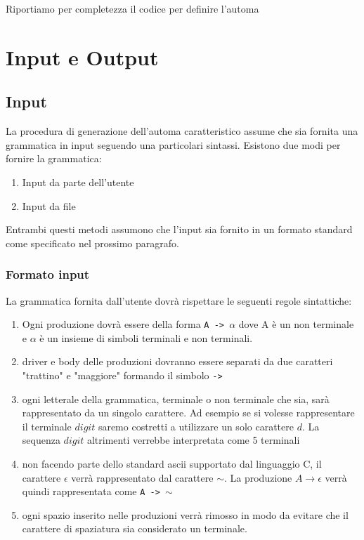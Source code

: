 \documentclass[12pt]{article}
\begin{document}
Riportiamo per completezza il codice per definire l'automa


\section{Input e Output}

\subsection{Input}
La procedura di generazione dell'automa caratteristico assume che sia fornita una grammatica in input seguendo una particolari sintassi. Esistono due modi per fornire la grammatica:
\begin{enumerate}
\item Input da parte dell'utente
\item Input da file
\end{enumerate}

Entrambi questi metodi assumono che l'input sia fornito in un formato standard come specificato nel prossimo paragrafo.

\subsubsection{Formato input}\label{sec:inputformat}
La grammatica fornita dall'utente dovrà rispettare le seguenti regole sintattiche:
\begin{enumerate}
\item Ogni produzione dovrà essere della forma \texttt{A -> $\alpha$} dove A è un non terminale e $\alpha$ è un insieme di simboli terminali e non terminali. 
\item driver e body delle produzioni dovranno essere separati da due caratteri "trattino" e "maggiore" formando il simbolo \texttt{->} 
\item ogni letterale della grammatica, terminale o non terminale che sia, sarà rappresentato da un singolo carattere. Ad esempio se si volesse rappresentare il terminale $digit$ saremo costretti a utilizzare un solo carattere $d$. La sequenza $digit$ altrimenti verrebbe interpretata come 5 terminali
\item non facendo parte dello standard ascii supportato dal linguaggio C, il carattere $\epsilon$ verrà rappresentato dal carattere $\sim$.
La produzione $A \to \epsilon$ verrà quindi rappresentata come \texttt{A -> $\sim$}
\item ogni spazio inserito nelle produzioni verrà rimosso in modo da evitare che il carattere di spaziatura sia considerato un terminale.

\end{enumerate} 
\end{document}

